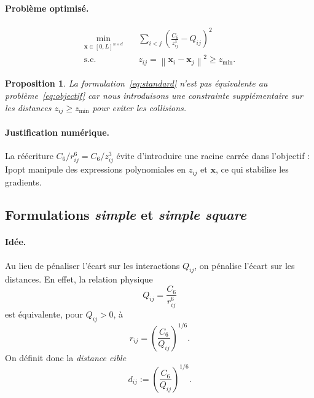 \documentclass[11pt,a4paper]{article}
\newtheorem{proposition}[theorem]{Proposition}
\theoremstyle{definition}
\theoremstyle{remark}
\newcommand{\norm}[1]{\left\|#1\right\|}
\newcommand{\cSix}{C_6}
\begin{document}
\paragraph{Problème optimisé.}
\begin{equation}
  \boxed{
  \begin{aligned}
    \min_{\mathbf{x} \in [0,L]^{n \times d}}
    &\quad
    \sum_{i<j}
    \left(
      \frac{\cSix}{z_{ij}^3}
      - Q_{ij}
    \right)^2
    \\
    \text{s.c.}
    &\quad
    z_{ij}
    =
    \norm{\mathbf{x}_i-\mathbf{x}_j}^2
    \geq
    z_{\min}.
  \end{aligned}
  }
  \label{eq:standard}
\end{equation}

\begin{proposition}
La formulation~\eqref{eq:standard} n'est pas équivalente au problème~\eqref{eq:objectif}
car nous introduisons une constrainte supplémentaire sur les distances $z_{ij} \geq z_{\min}$ pour eviter les collisions.
\end{proposition}



\paragraph{Justification numérique.}
La réécriture $\cSix/r_{ij}^6 = \cSix/z_{ij}^3$ évite d'introduire une
racine carrée dans l'objectif : Ipopt manipule des expressions
polynomiales en $z_{ij}$ et $\mathbf{x}$, ce qui stabilise les gradients.

\subsection{Formulations \emph{simple} et \emph{simple square}}
\label{sec:form-simple}

\paragraph{Idée.}
Au lieu de pénaliser l'écart sur les interactions $Q_{ij}$, on pénalise
l'écart sur les distances. En effet, la relation physique
\begin{equation}
  Q_{ij}
  =
  \frac{\cSix}{r_{ij}^6}
\end{equation}
est équivalente, pour $Q_{ij}>0$, à
\begin{equation}
  r_{ij}
  =
  \left(
    \frac{\cSix}{Q_{ij}}
  \right)^{1/6}.
\end{equation}
On définit donc la \emph{distance cible}
\begin{equation}
  d_{ij}
  :=
  \left(
    \frac{\cSix}{Q_{ij}}
  \right)^{1/6}.
  \label{eq:dij}
\end{equation}
\end{document}
